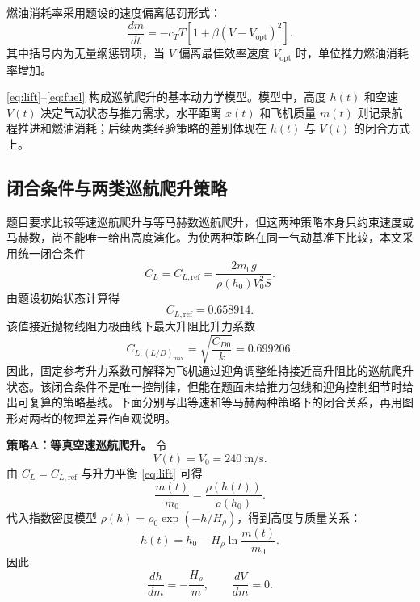 \documentclass[withoutpreface,bwprint]{cumcmthesis}
\begin{document}
燃油消耗率采用题设的速度偏离惩罚形式：
\begin{equation}
\frac{dm}{dt}=-c_TT\left[1+\beta(V-V_{\mathrm{opt}})^2\right].
\label{eq:fuel}
\end{equation}
其中括号内为无量纲惩罚项，当 $V$ 偏离最佳效率速度 $V_{\mathrm{opt}}$ 时，单位推力燃油消耗率增加。

\eqref{eq:lift}--\eqref{eq:fuel} 构成巡航爬升的基本动力学模型。模型中，高度 $h(t)$ 和空速 $V(t)$ 决定气动状态与推力需求，水平距离 $x(t)$ 和飞机质量 $m(t)$ 则记录航程推进和燃油消耗；后续两类经验策略的差别体现在 $h(t)$ 与 $V(t)$ 的闭合方式上。

\subsection{闭合条件与两类巡航爬升策略}

题目要求比较等速巡航爬升与等马赫数巡航爬升，但这两种策略本身只约束速度或马赫数，尚不能唯一给出高度演化。为使两种策略在同一气动基准下比较，本文采用统一闭合条件
\begin{equation}
C_L=C_{L,\mathrm{ref}}=\frac{2m_0g}{\rho(h_0)V_0^2S}.
\label{eq:CL_ref}
\end{equation}
由题设初始状态计算得
\begin{equation}
C_{L,\mathrm{ref}}=0.658914.
\label{eq:CL_ref_val}
\end{equation}
该值接近抛物线阻力极曲线下最大升阻比升力系数
\begin{equation}
C_{L,(L/D)_{\max}}=\sqrt{\frac{C_{D0}}{k}}=0.699206.
\label{eq:CL_maxLD}
\end{equation}
因此，固定参考升力系数可解释为飞机通过迎角调整维持接近高升阻比的巡航爬升状态。该闭合条件不是唯一控制律，但能在题面未给推力包线和迎角控制细节时给出可复算的策略基线。下面分别写出等速和等马赫两种策略下的闭合关系，再用图形对两者的物理差异作直观说明。

\textbf{策略A：等真空速巡航爬升。} 令
\begin{equation}
V(t)=V_0=240\ \mathrm{m/s}.
\label{eq:const_V}
\end{equation}
由 $C_L=C_{L,\mathrm{ref}}$ 与升力平衡 \eqref{eq:lift} 可得
\begin{equation}
\frac{m(t)}{m_0}=\frac{\rho(h(t))}{\rho(h_0)}.
\label{eq:m_rho_ratio}
\end{equation}
代入指数密度模型 $\rho(h)=\rho_0\exp(-h/H_\rho)$，得到高度与质量关系：
\begin{equation}
h(t)=h_0-H_\rho \ln\frac{m(t)}{m_0}.
\label{eq:h_vs_m_constV}
\end{equation}
因此
\begin{equation}
\frac{dh}{dm}=-\frac{H_\rho}{m},\qquad \frac{dV}{dm}=0.
\label{eq:deriv_constV}
\end{equation}
\end{document}
